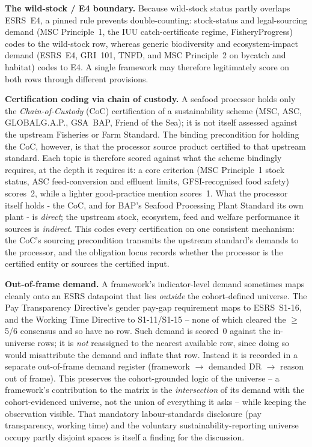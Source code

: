 \documentclass[
]{article}
\newcounter{none} %
\begin{document}
\textbf{The wild-stock / E4 boundary.} Because wild-stock status partly
overlaps ESRS~E4, a pinned rule prevents double-counting: stock-status
and legal-sourcing demand (MSC Principle~1, the IUU catch-certificate
regime, FisheryProgress) codes to the wild-stock row, whereas
generic biodiversity and ecosystem-impact demand (ESRS~E4, GRI~101,
TNFD, and MSC Principle~2 on bycatch and habitat) codes to E4. A single
framework may therefore legitimately score on both rows through different
provisions.

\textbf{Certification coding via chain of custody.} A seafood processor
holds only the \emph{Chain-of-Custody} (CoC) certification of a
sustainability scheme (MSC, ASC, GLOBALG.A.P., GSA~BAP, Friend of the
Sea); it is not itself assessed against the upstream Fisheries or Farm
Standard. The binding precondition for holding the CoC, however, is that
the processor source product certified to that upstream standard. Each
topic is therefore scored against what the scheme bindingly requires, at
the depth it requires it: a core criterion (MSC Principle~1 stock status,
ASC feed-conversion and effluent limits, GFSI-recognised food safety)
scores~2, while a lighter good-practice mention scores~1. What the
processor itself holds - the CoC, and for BAP's Seafood Processing
Plant Standard its own plant - is \emph{direct}; the upstream stock,
ecosystem, feed and welfare performance it sources is \emph{indirect}.
This codes every certification on one consistent mechanism: the CoC's
sourcing precondition transmits the upstream standard's demands to the
processor, and the obligation locus records whether the processor is the
certified entity or sources the certified input.

\textbf{Out-of-frame demand.} A framework's indicator-level demand
sometimes maps cleanly onto an ESRS datapoint that lies \emph{outside}
the cohort-defined universe. The Pay Transparency Directive's gender
pay-gap requirement maps to ESRS~S1-16, and the Working Time Directive to
S1-11/S1-15 -- none of which cleared the $\geq$5/6 consensus and so have no
row. Such demand is scored~0 against the in-universe rows; it is
\emph{not} reassigned to the nearest available row, since doing so would
misattribute the demand and inflate that row. Instead it is recorded in a
separate out-of-frame demand register (framework $\to$ demanded DR $\to$
reason out of frame). This preserves the cohort-grounded logic of the
universe -- a framework's contribution to the matrix is the
\emph{intersection} of its demand with the cohort-evidenced universe, not
the union of everything it asks -- while keeping the observation visible.
That mandatory labour-standards disclosure (pay transparency,
working time) and the voluntary sustainability-reporting universe occupy
partly disjoint spaces is itself a finding for the discussion.
\end{document}
